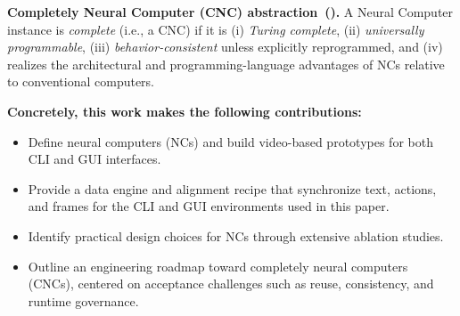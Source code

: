 \begin{tcolorbox}[
  colback=apricotglaze!40!white,
  colframe=metablue!40,
  interior style={shade,shading angle=315,left color=white,right color=apricotglaze!55!white},
  boxrule=0pt,
  borderline west={1pt}{0pt}{gray!60},
  left=6pt,right=4pt,top=3pt,bottom=3pt]
\small
\textbf{Completely Neural Computer (CNC) abstraction~().}
A Neural Computer instance is \emph{complete} (i.e., a CNC) if it is
(i) \emph{Turing complete},
(ii) \emph{universally programmable},
(iii) \emph{behavior-consistent} unless explicitly reprogrammed, and
(iv) realizes the architectural and programming-language advantages of NCs relative to conventional computers.
\end{tcolorbox}

\textbf{Concretely, this work makes the following contributions:}
{
\renewcommand\labelitemi{\large$\bullet$}
\begin{itemize}
\setlength{\itemsep}{2pt plus 1pt minus 1pt}
\setlength{\parskip}{0pt}
\item Define neural computers (NCs) and build video-based prototypes for both CLI and GUI interfaces.
\item Provide a data engine and alignment recipe that synchronize text, actions, and frames for the CLI and GUI environments used in this paper.
\item Identify practical design choices for NCs through extensive ablation studies.
\item Outline an engineering roadmap toward completely neural computers (CNCs), centered on acceptance challenges such as reuse, consistency, and runtime governance.

\end{itemize}
}
